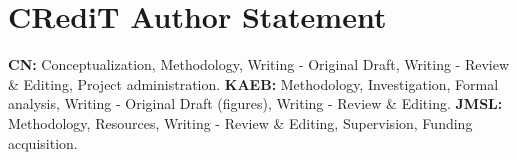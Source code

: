 \section*{CRediT Author Statement}

    \textbf{CN:} Conceptualization, Methodology, Writing - Original Draft, Writing -  Review  \&
    Editing, Project administration. \textbf{KAEB:} Methodology, Investigation, Formal analysis,
    Writing - Original Draft (figures), Writing - Review \& Editing. \textbf{JMSL:} Methodology,
    Resources, Writing - Review \& Editing, Supervision, Funding acquisition.


